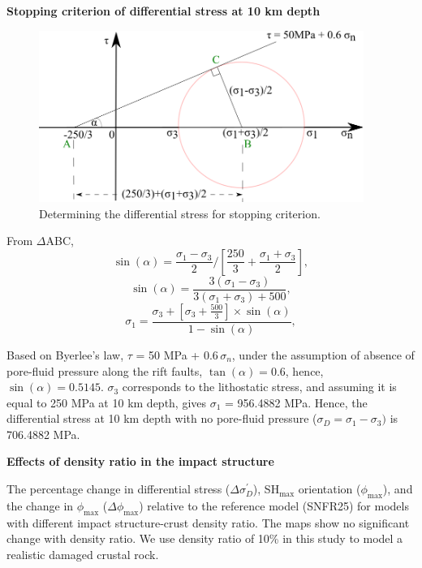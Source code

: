 \documentclass[draft,jgrga]{agutexSI2019}
\begin{document}
\begin{article}
\vspace{10mm} %

\noindent\textbf{Stopping criterion of differential stress at 10 km depth}
\vspace{10mm} %

\begin{figure}
\includegraphics[width=25pc]{Figures/Calc_diff_stress.png}
\caption{Determining the differential stress for stopping criterion.}
\label{S2}
\end{figure}

\vspace{5mm} %

From $\Delta$ABC,
\[
 \sin(\alpha) = \frac{\sigma_{1}-\sigma_{3}}{2}/[\frac{250}{3} + \frac{\sigma_{1}+\sigma_{3}}{2}],
\]
%
\[
 \sin(\alpha) = \frac{3(\sigma_{1}-\sigma_{3})}{3(\sigma_{1}+\sigma_{3})+500},
\]
%
\[
 \sigma_{1} = \frac{\sigma_{3}+[\sigma_{3}+\frac{500}{3}]\times \sin(\alpha)}{1-\sin(\alpha)},
\]

Based on Byerlee's law, $\tau$  = 50 MPa + 0.6$\,\sigma_n$, under the assumption of absence of pore-fluid pressure along the rift faults, $\tan(\alpha) = 0.6$, hence, $\sin(\alpha)= 0.5145$. $\sigma_{3}$ corresponds to the lithostatic stress, and assuming it is equal to 250 MPa at 10 km depth, gives $\sigma_{1}$ = 956.4882 MPa. Hence, the differential stress at 10 km depth with no pore-fluid pressure ($\sigma_{D} = \sigma_{1} - \sigma_{3})$ is 706.4882 MPa. 

\vspace{10mm} %

\noindent\textbf{Effects of density ratio in the impact structure}

The percentage change in differential stress ($\Delta\sigma_{D}^{\prime}$), SH$_{\max}$ orientation ($\phi_{\max}$), and the change in $\phi_{\max}$ ($\Delta\phi_{\max}$) relative to the reference model (SNFR25) for models with different impact structure-crust density ratio.  The maps show no significant change with density ratio. We use density ratio of 10\% in this study to model a realistic damaged crustal rock. 
\vspace{10mm} %


\end{article}
\end{document}
